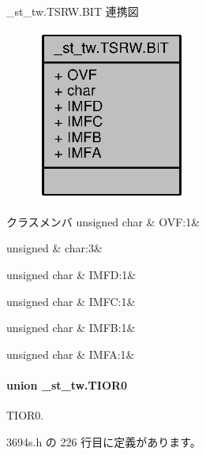 \+\_\+st\+\_\+tw.\+T\+S\+R\+W.\+B\+I\+T 連携図
\nopagebreak
\begin{figure}[H]
\begin{center}
\leavevmode
\includegraphics[width=140pt]{d4/d17/struct__st__tw_8TSRW_8BIT__coll__graph}
\end{center}
\end{figure}
\begin{DoxyFields}{クラスメンバ}
unsigned char\label{3694s_8h_a7f74ef1b079020a932a9f48bcaf217b0}
&
O\+V\+F\+:1&
\\
\hline

unsigned\label{3694s_8h_aa87deb01c5f539e6bda34829c8ef2368}
&
char\+:3&
\\
\hline

unsigned char\label{3694s_8h_a3ad55e8e66aad3df2ffcf1e5a35101cd}
&
I\+M\+F\+D\+:1&
\\
\hline

unsigned char\label{3694s_8h_a977e340be46cc94db59c5ff9e7781298}
&
I\+M\+F\+C\+:1&
\\
\hline

unsigned char\label{3694s_8h_a1846a3cf07a74f5647b4b602d6040149}
&
I\+M\+F\+B\+:1&
\\
\hline

unsigned char\label{3694s_8h_ab1a07177dfe4fed81e433db9d5d10c6b}
&
I\+M\+F\+A\+:1&
\\
\hline

\end{DoxyFields}
\label{union__st__tw_8TIOR0}
\paragraph{union \+\_\+st\+\_\+tw.\+T\+I\+O\+R0}
T\+I\+O\+R0. 

 3694s.\+h の 226 行目に定義があります。



